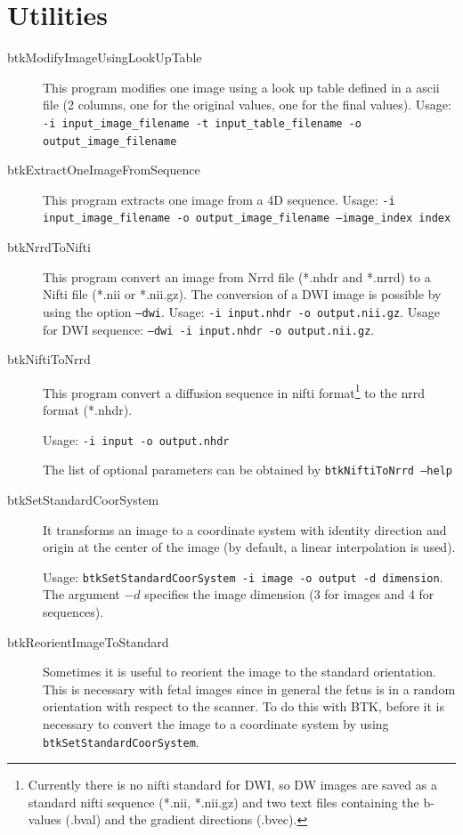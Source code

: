 \section{Utilities}
\label{sec:utilities}

\begin{description}

\item[btkModifyImageUsingLookUpTable] This program modifies one image using a
look up table defined in a ascii file (2 columns, one for the original values,
one for the final values). Usage: \texttt{-i input\_image\_filename -t
input\_table\_filename -o output\_image\_filename}
  
\item[btkExtractOneImageFromSequence] This program extracts one image from a 4D sequence. Usage: \texttt{-i input\_image\_filename -o output\_image\_filename --image\_index index}

\item[btkNrrdToNifti] This program convert an image from Nrrd file (*.nhdr and *.nrrd) to a Nifti file (*.nii or *.nii.gz). The conversion of a DWI image is possible by using the option \texttt{--dwi}. Usage: \texttt{-i input.nhdr -o output.nii.gz}. Usage for DWI sequence: \texttt{--dwi -i input.nhdr -o output.nii.gz}.

\item[btkNiftiToNrrd] This program convert a diffusion sequence in nifti
format\footnote{Currently there is no nifti standard for DWI, so DW images are
saved as a standard nifti sequence (*.nii, *.nii.gz) and two text files
containing the b-values (.bval) and the gradient directions (.bvec).}  to the
nrrd format (*.nhdr). 

Usage: \texttt{-i input -o output.nhdr}

The list of optional parameters can be obtained by \texttt{btkNiftiToNrrd
--help}

\item[btkSetStandardCoorSystem] It transforms an image to a coordinate
system with identity direction and origin at the center of the image
(by default, a linear interpolation is used).

Usage: \texttt{btkSetStandardCoorSystem -i image -o output -d dimension}. The
argument $-d$ specifies the image dimension (3 for images and 4 for sequences). 
\\

  \item[btkReorientImageToStandard] Sometimes it is useful
to reorient the image to the standard orientation. This is necessary with fetal
images since in general the fetus is in a random orientation with respect to the
scanner. To do this with BTK, before it is necessary to convert the image
to a coordinate system by using \texttt{btkSetStandardCoorSystem}.


\end{description}
